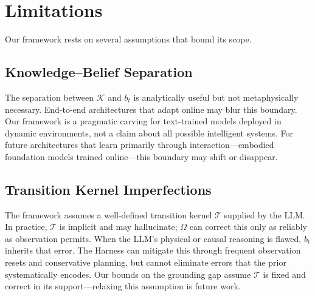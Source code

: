 \section{Limitations}

Our framework rests on several assumptions that bound its scope.

\subsection{Knowledge--Belief Separation}

The separation between $\mathcal{K}$ and $b_t$ is analytically useful but not metaphysically necessary. End-to-end architectures that adapt online may blur this boundary. Our framework is a pragmatic carving for text-trained models deployed in dynamic environments, not a claim about all possible intelligent systems. For future architectures that learn primarily through interaction---embodied foundation models trained online---this boundary may shift or disappear.

\subsection{Transition Kernel Imperfections}

The framework assumes a well-defined transition kernel $\mathcal{T}$ supplied by the LLM. In practice, $\mathcal{T}$ is implicit and may hallucinate; $\Omega$ can correct this only as reliably as observation permits. When the LLM's physical or causal reasoning is flawed, $b_t$ inherits that error. The Harness can mitigate this through frequent observation resets and conservative planning, but cannot eliminate errors that the prior systematically encodes. Our bounds on the grounding gap assume $\mathcal{T}$ is fixed and correct in its support---relaxing this assumption is future work.

